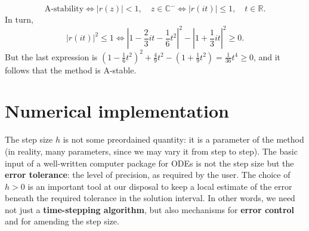 \documentclass[a4paper]{article}
\begin{document}
\begin{example}
\[
\text {A-stability} \iff |r(z)|<1, \quad z \in \mathbb{C}^{-}  \iff  |r(i t)| \leq 1, \quad t \in \mathbb{R} .
\]
In turn,
\[
|r(i t)|^2 \leq 1  \iff  \left|1-\frac{2}{3} i t-\frac{1}{6} t^2\right|^2-\left|1+\frac{1}{3} i t\right|^2 \geq 0 .
\]
But the last expression is $\left(1-\frac{1}{6} t^2\right)^2+\frac{4}{9} t^2-\left(1+\frac{1}{9} t^2\right)=\frac{1}{36} t^4 \geq 0$, and it follows that the method is A-stable.
\end{example}

\section{Numerical implementation}
\begin{problem}
    The step size $h$ is not some preordained quantity: it is a parameter of the method (in reality, many parameters, since we may vary it from step to step). The basic input of a well-written computer package for ODEs is not the step size but the \textbf{error tolerance}: the level of precision, as required by the user. The choice of $h>0$ is an important tool at our disposal to keep a local estimate of the error beneath the required tolerance in the solution interval. In other words, we need not just a \textbf{time-stepping algorithm}, but also mechanisms for \textbf{error control} and for amending the step size.
\end{problem}
\end{document}
